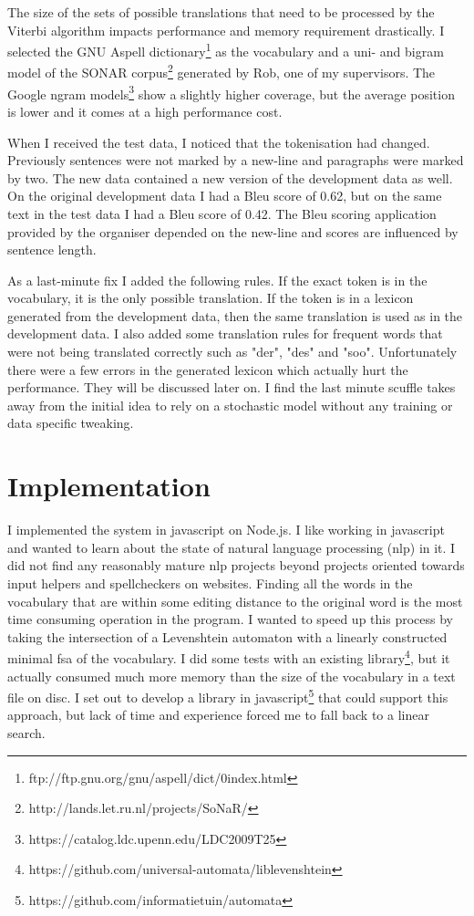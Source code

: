 \documentclass[11pt]{article}
\begin{document}
The size of the sets of possible translations that need to be processed by the Viterbi algorithm impacts performance and memory requirement drastically. I selected the GNU Aspell dictionary\footnote{ftp://ftp.gnu.org/gnu/aspell/dict/0index.html} as the vocabulary and a uni- and bigram model of the SONAR corpus\footnote{http://lands.let.ru.nl/projects/SoNaR/} generated by Rob, one of my supervisors. The Google ngram models\footnote{https://catalog.ldc.upenn.edu/LDC2009T25} show a slightly higher coverage, but the average position is lower and it comes at a high performance cost.

When I received the test data, I noticed that the tokenisation had changed. Previously sentences were not marked by a new-line and paragraphs were marked by two. The new data contained a new version of the development data as well. On the original development data I had a Bleu score of 0.62, but on the same text in the test data I had a Bleu score of 0.42. The Bleu scoring application provided by the organiser depended on the new-line and scores are influenced by sentence length.

As a last-minute fix I added the following rules. If the exact token is in the vocabulary, it is the only possible translation. If the token is in a lexicon generated from the development data, then the same translation is used as in the development data. I also added some translation rules for frequent words that were not being translated correctly such as "der", "des" and "soo". Unfortunately there were a few errors in the generated lexicon which actually hurt the performance. They will be discussed later on. I find the last minute scuffle takes away from the initial idea to rely on a stochastic model without any training or data specific tweaking.

\section{Implementation}

I implemented the system in javascript on Node.js. I like working in javascript and wanted to learn about the state of natural language processing (nlp) in it. I did not find any reasonably mature nlp projects beyond projects oriented towards input helpers and spellcheckers on websites. Finding all the words in the vocabulary that are within some editing distance to the original word is the most time consuming operation in the program. I wanted to speed up this process by taking the intersection of a Levenshtein automaton with a linearly constructed minimal fsa of the vocabulary. I did some tests with an existing library\footnote{https://github.com/universal-automata/liblevenshtein}, but it actually consumed much more memory than the size of the vocabulary in a text file on disc. I set out to develop a library in javascript\footnote{https://github.com/informatietuin/automata} that could support this approach, but lack of time and experience forced me to fall back to a linear search.
\end{document}
